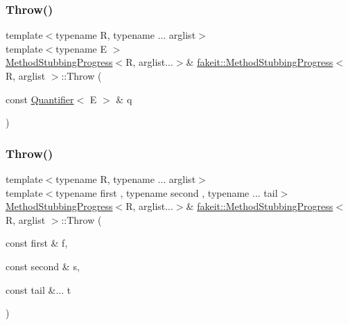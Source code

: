 \mbox{\label{structfakeit_1_1MethodStubbingProgress_a93c74210adfc0ec4662aff15f78834c7}} 
\subsubsection{\texorpdfstring{Throw()}{Throw()}\hspace{0.1cm}{\footnotesize\ttfamily [23/27]}}
{\footnotesize\ttfamily template$<$typename R, typename ... arglist$>$ \\
template$<$typename E $>$ \\
\mbox{\hyperlink{structfakeit_1_1MethodStubbingProgress}{Method\+Stubbing\+Progress}}$<$R, arglist...$>$\& \mbox{\hyperlink{structfakeit_1_1MethodStubbingProgress}{fakeit\+::\+Method\+Stubbing\+Progress}}$<$ R, arglist $>$\+::Throw (\begin{DoxyParamCaption}\item[{const \mbox{\hyperlink{structfakeit_1_1Quantifier}{Quantifier}}$<$ E $>$ \&}]{q }\end{DoxyParamCaption})\hspace{0.3cm}{\ttfamily [inline]}}

\mbox{\label{structfakeit_1_1MethodStubbingProgress_a516a0ade529c61e4ab6df1bf47f3f1b2}} 
\subsubsection{\texorpdfstring{Throw()}{Throw()}\hspace{0.1cm}{\footnotesize\ttfamily [24/27]}}
{\footnotesize\ttfamily template$<$typename R, typename ... arglist$>$ \\
template$<$typename first , typename second , typename ... tail$>$ \\
\mbox{\hyperlink{structfakeit_1_1MethodStubbingProgress}{Method\+Stubbing\+Progress}}$<$R, arglist...$>$\& \mbox{\hyperlink{structfakeit_1_1MethodStubbingProgress}{fakeit\+::\+Method\+Stubbing\+Progress}}$<$ R, arglist $>$\+::Throw (\begin{DoxyParamCaption}\item[{const first \&}]{f,  }\item[{const second \&}]{s,  }\item[{const tail \&...}]{t }\end{DoxyParamCaption})\hspace{0.3cm}{\ttfamily [inline]}}

